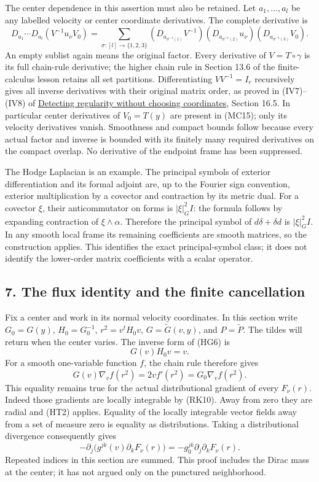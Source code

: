 \documentclass[
  11pt,
]{article}
\begin{document}
The center dependence in this assertion must also be retained. Let
\(a_1,\ldots,a_l\) be any labelled velocity or center coordinate
derivatives. The complete derivative is \[
 D_{a_1}\cdots D_{a_l}(V^{-1}u_\nu V_0)
 =\sum_{\sigma:[l]\to\{1,2,3\}}
       (D_{a_{\sigma^{-1}(1)}}V^{-1})
       (D_{a_{\sigma^{-1}(2)}}u_\nu)
       (D_{a_{\sigma^{-1}(3)}}V_0).
 \tag{MC15}
\] An empty sublist again means the original factor. Every derivative of
\(V=T\circ\gamma\) is its full chain-rule derivative; the higher chain
rule in Section 13.6 of the finite-calculus lesson retains all set
partitions. Differentiating \(VV^{-1}=I_r\) recursively gives all
inverse derivatives with their original matrix order, as proved in
(IV7)--(IV8) of \href{geometric-microlocal-calculus.pdf}{Detecting
regularity without choosing coordinates}, Section 16.5. In particular
center derivatives of \(V_0=T(y)\) are present in (MC15); only its
velocity derivatives vanish. Smoothness and compact bounds follow
because every actual factor and inverse is bounded with its finitely
many required derivatives on the compact overlap. No derivative of the
endpoint frame has been suppressed.

The Hodge Laplacian is an example. The principal symbols of exterior
differentiation and its formal adjoint are, up to the Fourier sign
convention, exterior multiplication by a covector and contraction by its
metric dual. For a covector \(\xi\), their anticommutator on forms is
\(|\xi|_G^2 I\): the formula follows by expanding contraction of
\(\xi\wedge\alpha\). Therefore the principal symbol of
\(d\delta+\delta d\) is \(|\xi|_G^2 I\). In any smooth local frame its
remaining coefficients are smooth matrices, so the construction applies.
This identifies the exact principal-symbol class; it does not identify
the lower-order matrix coefficients with a scalar operator.

\subsection{7. The flux identity and the finite
cancellation}\label{the-flux-identity-and-the-finite-cancellation}

Fix a center and work in its normal velocity coordinates. In this
section write \(G_0=G(y)\), \(H_0=G_0^{-1}\), \(r^2=v^tH_0v\),
\(G=\widetilde G(v,y)\), and \(P=\widetilde P\). The tildes will return
when the center varies. The inverse form of (HG6) is \[
                         G(v)H_0v=v.                         \tag{HT1}
\] For a smooth one-variable function \(f\), the chain rule therefore
gives \[
 G(v)\nabla_v f(r^2)=2v f'(r^2)=G_0\nabla_v f(r^2).            \tag{HT2}
\] This equality remains true for the actual distributional gradient of
every \(F_\nu(r)\). Indeed those gradients are locally integrable by
(RK10). Away from zero they are radial and (HT2) applies. Equality of
the locally integrable vector fields away from a set of measure zero is
equality as distributions. Taking a distributional divergence
consequently gives \[
 -\partial_j\bigl(g^{jk}(v)\partial_kF_\nu(r)\bigr)
             =-g_0^{jk}\partial_j\partial_kF_\nu(r).           \tag{HT3}
\] Repeated indices in this section are summed. This proof includes the
Dirac mass at the center; it has not argued only on the punctured
neighborhood.
\end{document}
